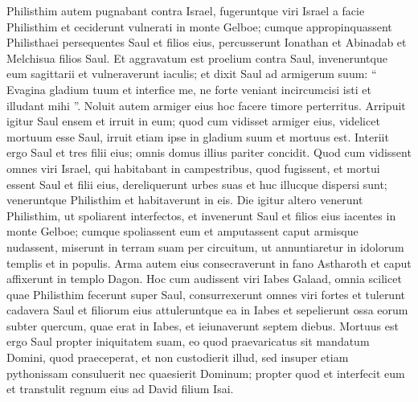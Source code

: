 \begin{biblechapter}
\begin{biblechapter}
\begin{biblechapter}
\begin{biblechapter}
\begin{biblechapter}
\begin{biblechapter}
\begin{biblechapter}
\begin{biblechapter}
\begin{biblechapter}
\begin{biblechapter}
\verse Philisthim autem pugnabant contra Israel, fugeruntque viri Israel a facie Philisthim et ceciderunt vulnerati in monte Gelboe; 
\verse cumque appropinquassent Philisthaei persequentes Saul et filios eius, percusserunt Ionathan et Abinadab et Melchisua filios Saul. 
\verse Et aggravatum est proelium contra Saul, inveneruntque eum sagittarii et vulneraverunt iaculis; 
\verse et dixit Saul ad armigerum suum: “ Evagina gladium tuum et interfice me, ne forte veniant incircumcisi isti et illudant mihi ”. Noluit autem armiger eius hoc facere timore perterritus. Arripuit igitur Saul ensem et irruit in eum; 
\verse quod cum vidisset armiger eius, videlicet mortuum esse Saul, irruit etiam ipse in gladium suum et mortuus est. 
\verse Interiit ergo Saul et tres filii eius; omnis domus illius pariter concidit.
 \verse Quod cum vidissent omnes viri Israel, qui habitabant in campestribus, quod fugissent, et mortui essent Saul et filii eius, dereliquerunt urbes suas et huc illucque dispersi sunt; veneruntque Philisthim et habitaverunt in eis. 
\verse Die igitur altero venerunt Philisthim, ut spoliarent interfectos, et invenerunt Saul et filios eius iacentes in monte Gelboe; 
\verse cumque spoliassent eum et amputassent caput armisque nudassent, miserunt in terram suam per circuitum, ut annuntiaretur in idolorum templis et in populis. 
\verse Arma autem eius consecraverunt in fano Astharoth et caput affixerunt in templo Dagon.
 \verse Hoc cum audissent viri Iabes Galaad, omnia scilicet quae Philisthim fecerunt super Saul, 
\verse consurrexerunt omnes viri fortes et tulerunt cadavera Saul et filiorum eius attuleruntque ea in Iabes et sepelierunt ossa eorum subter quercum, quae erat in Iabes, et ieiunaverunt septem diebus.
 \verse Mortuus est ergo Saul propter iniquitatem suam, eo quod praevaricatus sit mandatum Domini, quod praeceperat, et non custodierit illud, sed insuper etiam pythonissam consuluerit 
\verse nec quaesierit Dominum; propter quod et interfecit eum et transtulit regnum eius ad David filium Isai.
 

\end{biblechapter}
\end{biblechapter}
\end{biblechapter}
\end{biblechapter}
\end{biblechapter}
\end{biblechapter}
\end{biblechapter}
\end{biblechapter}
\end{biblechapter}
\end{biblechapter}
